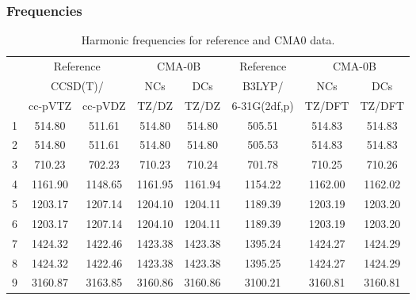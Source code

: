 \documentclass[10pt,oneside]{article}
\begin{document}
\subsubsection*{Frequencies}
\begin{table}[h!]
\centering
\caption{Harmonic frequencies for reference and CMA0 data.}
\begin{tabular}{cccccccc}
\toprule
{} & \multicolumn{2}{c}{Reference} & \multicolumn{2}{c}{CMA-0B} &    Reference & \multicolumn{2}{c}{CMA-0B} \\
{} & \multicolumn{2}{c}{CCSD(T)/} &     NCs &     DCs &       B3LYP/ &     NCs &     DCs \\
{} &   cc-pVTZ & cc-pVDZ &   TZ/DZ &   TZ/DZ & 6-31G(2df,p) &  TZ/DFT &  TZ/DFT \\
\midrule
1 &    514.80 &  511.61 &  514.80 &  514.80 &       505.51 &  514.83 &  514.83 \\
2 &    514.80 &  511.61 &  514.80 &  514.80 &       505.53 &  514.83 &  514.83 \\
3 &    710.23 &  702.23 &  710.23 &  710.24 &       701.78 &  710.25 &  710.26 \\
4 &   1161.90 & 1148.65 & 1161.95 & 1161.94 &      1154.22 & 1162.00 & 1162.02 \\
5 &   1203.17 & 1207.14 & 1204.10 & 1204.11 &      1189.39 & 1203.19 & 1203.20 \\
6 &   1203.17 & 1207.14 & 1204.10 & 1204.11 &      1189.39 & 1203.19 & 1203.20 \\
7 &   1424.32 & 1422.46 & 1423.38 & 1423.38 &      1395.24 & 1424.27 & 1424.29 \\
8 &   1424.32 & 1422.46 & 1423.38 & 1423.38 &      1395.25 & 1424.27 & 1424.29 \\
9 &   3160.87 & 3163.85 & 3160.86 & 3160.86 &      3100.21 & 3160.81 & 3160.81 \\
\bottomrule
\end{tabular}
\end{table}

\clearpage
\end{document}

